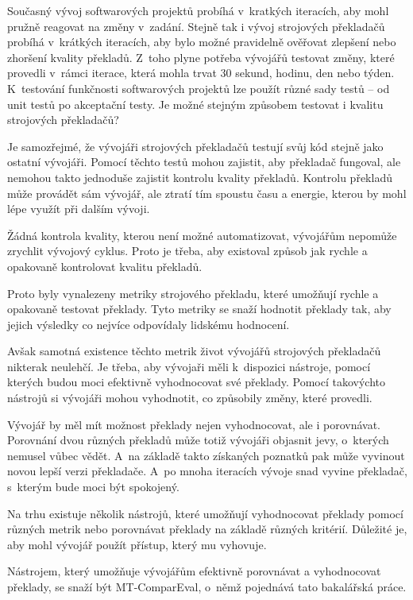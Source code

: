 Současný vývoj softwarových projektů probíhá v~kratkých iteracích,
  aby mohl pružně reagovat na změny v~zadání.
Stejně tak i vývoj strojových překladačů probíhá v~krátkých iteracích,
  aby bylo možné pravidelně ověřovat zlepšení nebo zhoršení kvality překladů.
Z~toho plyne potřeba vývojářů testovat změny,
  které provedli v~rámci iterace,
  která mohla trvat 30 sekund, hodinu, den nebo týden.
K~testování funkčnosti softwarových projektů lze použít různé sady testů -- od unit testů po akceptační testy.
Je možné stejným způsobem testovat i kvalitu strojových překladačů?

Je samozřejmé, 
  že vývojáři strojových překladačů testují svůj kód stejně jako ostatní vývojáři.
Pomocí těchto testů mohou zajistit,
  aby překladač fungoval,
  ale nemohou takto jednoduše zajistit kontrolu kvality překladů.
Kontrolu překladů může provádět sám vývojář,
  ale ztratí tím spoustu času a energie,
  kterou by mohl lépe využít při dalším vývoji.

Žádná kontrola kvality, kterou není možné automatizovat,
  vývojářům nepomůže zrychlit vývojový cyklus.
Proto je třeba,
  aby existoval způsob jak rychle a opakovaně kontrolovat kvalitu překladů.

Proto byly vynalezeny metriky strojového překladu,
  které umožňují rychle a opakovaně testovat překlady.
Tyto metriky se snaží hodnotit překlady tak,
  aby jejich výsledky co nejvíce odpovídaly lidskému hodnocení.

Avšak samotná existence těchto metrik život vývojářů strojových překladačů nikterak neulehčí.
Je třeba, aby vývojaři měli k~dispozici nástroje,
  pomocí kterých budou moci efektivně vyhodnocovat své překlady.
Pomocí takovýchto nástrojů si vývojáři mohou vyhodnotit,
  co způsobily změny, které provedli.

Vývojář by měl mít možnost překlady nejen vyhodnocovat,
  ale i porovnávat.
Porovnání dvou různých překladů může totiž vývojáři objasnit jevy,
  o~kterých nemusel vůbec vědět.
A~na základě takto získaných poznatků pak může vyvinout novou lepší verzi překladače.
A~po mnoha iteracích vývoje snad vyvine překladač,
  s~kterým bude moci být spokojený.

Na trhu existuje několik nástrojů,
  které umožňují vyhodnocovat překlady pomocí různých metrik
  nebo porovnávat překlady na základě různých kritérií.
Důležité je,
  aby mohl vývojář použít přístup,
  který mu vyhovuje.

Nástrojem,
  který umožňuje vývojářům efektivně porovnávat a vyhodnocovat překlady,
  se snaží být MT-ComparEval, 
  o~němž pojednává tato bakalářská práce.
